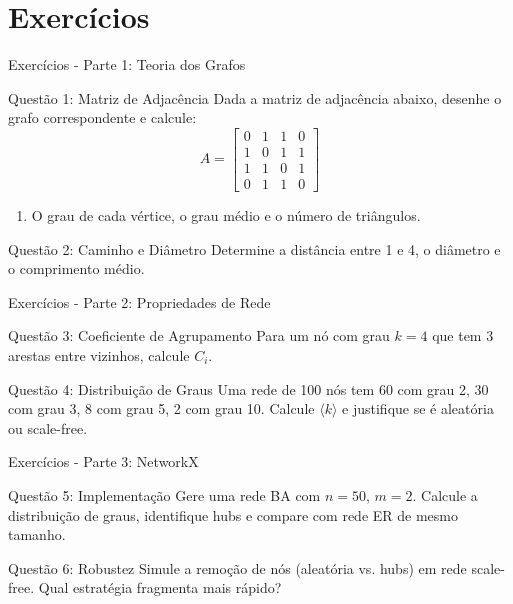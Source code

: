 \section{Exercícios}

\begin{frame}[shrink=15]{Exercícios - Parte 1: Teoria dos Grafos}
\begin{block}{Questão 1: Matriz de Adjacência}
Dada a matriz de adjacência abaixo, desenhe o grafo correspondente e calcule:
\begin{equation*}
A = \begin{bmatrix}
0 & 1 & 1 & 0 \\
1 & 0 & 1 & 1 \\
1 & 1 & 0 & 1 \\
0 & 1 & 1 & 0
\end{bmatrix}
\end{equation*}
\begin{enumerate}
    \item O grau de cada vértice, o grau médio e o número de triângulos.
\end{enumerate}
\end{block}

\begin{block}{Questão 2: Caminho e Diâmetro}
Determine a distância entre 1 e 4, o diâmetro e o comprimento médio.
\end{block}
\end{frame}

\begin{frame}[shrink=15]{Exercícios - Parte 2: Propriedades de Rede}
\begin{block}{Questão 3: Coeficiente de Agrupamento}
Para um nó com grau $k=4$ que tem 3 arestas entre vizinhos, calcule $C_i$.
\end{block}

\begin{block}{Questão 4: Distribuição de Graus}
Uma rede de 100 nós tem 60 com grau 2, 30 com grau 3, 8 com grau 5, 2 com grau 10.
Calcule $\langle k \rangle$ e justifique se é aleatória ou scale-free.
\end{block}
\end{frame}

\begin{frame}[shrink=15]{Exercícios - Parte 3: NetworkX}
\begin{block}{Questão 5: Implementação}
Gere uma rede BA com $n=50$, $m=2$. Calcule a distribuição de graus, identifique hubs e compare com rede ER de mesmo tamanho.
\end{block}

\begin{alertblock}{Questão 6: Robustez}
Simule a remoção de nós (aleatória vs. hubs) em rede scale-free. Qual estratégia fragmenta mais rápido?
\end{alertblock}
\end{frame}

